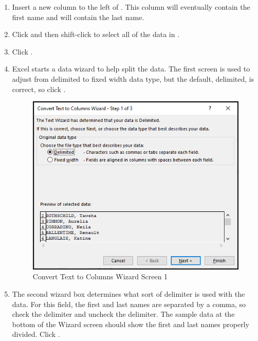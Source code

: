 \begin{enumerate}
	\item Insert a new column to the left of . This column will eventually contain the first name and  will contain the last name.
	\item Click  and then shift-click  to select all of the data in .
	\item Click .
	\item Excel starts a data wizard to help split the data. The first screen is used to adjust from delimited to fixed width data type, but the default, delimited, is correct, so click .
	
	\begin{figure}[H]
		\centering
		\includegraphics[width=\maxwidth{.75\linewidth}]{gfx/ch09_fig30}
		\caption{Convert Text to Columns Wizard Screen 1}
		\label{09:fig30}
	\end{figure}

	\item The second wizard box determines what sort of delimiter is used with the data. For this field, the first and last names are separated by a comma, so check the  delimiter and uncheck the  delimiter. The sample data at the bottom of the Wizard screen should show the first and last names properly divided. Click .


\end{enumerate}
